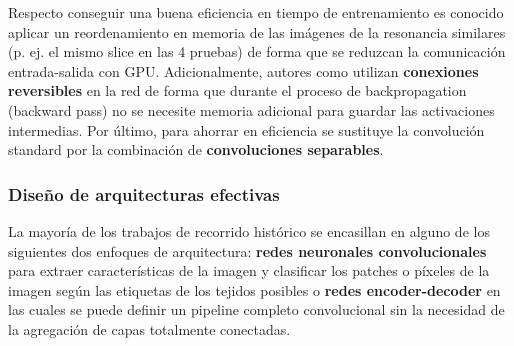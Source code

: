 			Respecto conseguir una buena eficiencia en tiempo de entrenamiento es conocido aplicar un reordenamiento en memoria de las imágenes de la resonancia similares (p. ej. el mismo slice en las 4 pruebas) de forma que se reduzcan la comunicación entrada-salida con GPU. Adicionalmente, autores como \cite{brugger2019partially} utilizan \textbf{conexiones reversibles}  en la red de forma que durante el proceso de backpropagation (backward pass) no se necesite memoria adicional para guardar las activaciones intermedias. Por último, para ahorrar en eficiencia se sustituye la convolución standard por la combinación de \textbf{convoluciones separables}.
			
			\subsubsection{Diseño de arquitecturas efectivas}
			
			La mayoría de los trabajos de recorrido histórico se encasillan en alguno de los siguientes dos enfoques de arquitectura: \textbf{redes neuronales convolucionales} para extraer características de la imagen y clasificar los patches o píxeles de la imagen según las etiquetas de los tejidos posibles o \textbf{redes encoder-decoder} en las cuales se puede definir un pipeline completo convolucional sin la necesidad de la agregación de capas totalmente conectadas.
			
